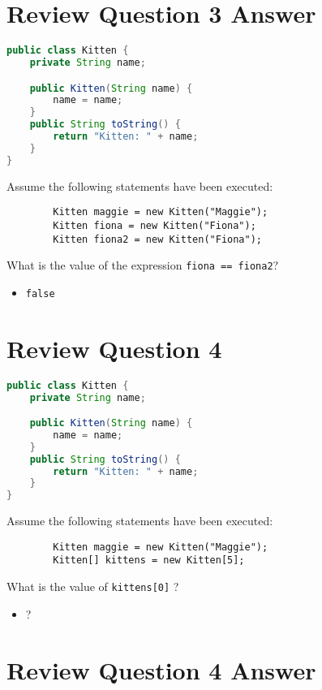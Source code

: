 \documentclass{article}
\begin{document}
\section{Review Question 3 Answer}

\begin{lstlisting}[language=Java]
public class Kitten {
    private String name;

    public Kitten(String name) {
        name = name;
    }
    public String toString() {
        return "Kitten: " + name;
    }
}
\end{lstlisting}

Assume the following statements have been executed:

\begin{lstlisting}
        Kitten maggie = new Kitten("Maggie");
        Kitten fiona = new Kitten("Fiona");
        Kitten fiona2 = new Kitten("Fiona");
\end{lstlisting}

What is the value of the expression {\tt fiona == fiona2}?
\begin{itemize}
\itemsep0em
\item {\tt false}
\end{itemize}




\section{Review Question 4}

\begin{lstlisting}[language=Java]
public class Kitten {
    private String name;

    public Kitten(String name) {
        name = name;
    }
    public String toString() {
        return "Kitten: " + name;
    }
}
\end{lstlisting}

Assume the following statements have been executed:

\begin{lstlisting}
        Kitten maggie = new Kitten("Maggie");
        Kitten[] kittens = new Kitten[5];
\end{lstlisting}

What is the value of {\tt kittens[0]} ?
\begin{itemize}
\itemsep0em
\item ?
\end{itemize}




\section{Review Question 4 Answer}
\end{document}
